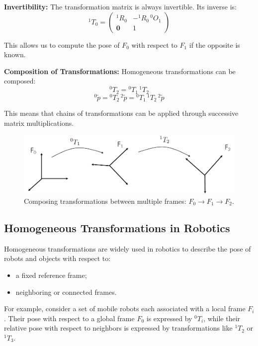 \textbf{Invertibility:}
The transformation matrix is always invertible. Its inverse is:
\[
{}^1\!T_0 =
\begin{pmatrix}
{}^1\!R_0 & -{}^1\!R_0\,{}^0\!O_1 \\
\mathbf{0} & 1
\end{pmatrix}
\]

This allows us to compute the pose of $F_0$ with respect to $F_1$ if the opposite is known.

\textbf{Composition of Transformations:}
Homogeneous transformations can be composed:
\[
{}^0\!T_2 = {}^0\!T_1\, {}^1\!T_2
\]
\[
{}^0\!\tilde{p} = {}^0\!T_2\, {}^2\!\tilde{p} = {}^0\!T_1\, {}^1\!T_2\, {}^2\!\tilde{p}
\]

This means that chains of transformations can be applied through successive matrix multiplications.

\begin{figure}[H]
  \centering
  \includegraphics[width=\linewidth]{imgs/homogeneous_chain_composition.png}
  \caption{Composing transformations between multiple frames: $F_0 \rightarrow F_1 \rightarrow F_2$.}
\end{figure}

\hfill

\subsection{Homogeneous Transformations in Robotics}

Homogeneous transformations are widely used in robotics to describe the pose of robots and objects with respect to:
\begin{itemize}
  \item a fixed reference frame;
  \item neighboring or connected frames.
\end{itemize}

For example, consider a set of mobile robots each associated with a local frame $F_i$. Their pose with respect to a global frame $F_0$ is expressed by ${}^0T_i$, while their relative pose with respect to neighbors is expressed by transformations like ${}^1T_2$ or ${}^1T_3$.

